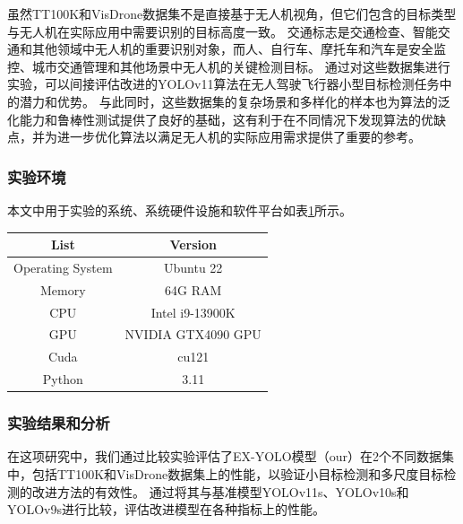 虽然TT100K和VisDrone数据集不是直接基于无人机视角，但它们包含的目标类型与无人机在实际应用中需要识别的目标高度一致。
交通标志是交通检查、智能交通和其他领域中无人机的重要识别对象，而人、自行车、摩托车和汽车是安全监控、城市交通管理和其他场景中无人机的关键检测目标。
通过对这些数据集进行实验，可以间接评估改进的YOLOv11算法在无人驾驶飞行器小型目标检测任务中的潜力和优势。
与此同时，这些数据集的复杂场景和多样化的样本也为算法的泛化能力和鲁棒性测试提供了良好的基础，这有利于在不同情况下发现算法的优缺点，并为进一步优化算法以满足无人机的实际应用需求提供了重要的参考。

\subsubsection{实验环境}

本文中用于实验的系统、系统硬件设施和软件平台如表\ref{tab:environment}所示。
\begin{table}[htbp]
    \centering
    \captionsetup{font=footnotesize}
    \label{tab:environment}
    \begin{tabular}{cc}
        \toprule
        List              & Version            \\ 
        \midrule
        Operating System  & Ubuntu 22          \\
        Memory            & 64G RAM            \\
        CPU               & Intel i9-13900K    \\
        GPU               & NVIDIA GTX4090 GPU \\
        Cuda              & cu121              \\
        Python            & 3.11               \\
        \bottomrule
    \end{tabular}
\end{table}

\subsubsection{实验结果和分析}

在这项研究中，我们通过比较实验评估了EX-YOLO模型（our）在2个不同数据集中，包括TT100K和VisDrone数据集上的性能，以验证小目标检测和多尺度目标检测的改进方法的有效性。
通过将其与基准模型YOLOv11s、YOLOv10s和YOLOv9s进行比较，评估改进模型在各种指标上的性能。

